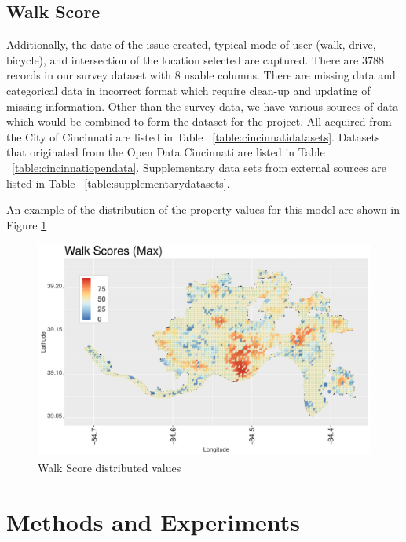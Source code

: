 \documentclass{llncs}
\begin{document}

\subsection{Walk Score\textsuperscript{\tiny\textregistered}}

Additionally, the date of the issue created, typical mode of user (walk, drive, bicycle), and intersection of the location selected are captured. There are 3788 records in our survey dataset with 8 usable columns. There are missing data and categorical data in incorrect format which require clean-up and updating of missing information. Other than the survey data, we have various sources of data which would be combined to form the dataset for the project. All acquired from the City of Cincinnati are listed in Table ~\ref{table:cincinnatidatasets}. Datasets that originated from the Open Data Cincinnati are listed in Table ~\ref{table:cincinnatiopendata}.  Supplementary data sets from external sources are listed in Table ~\ref{table:supplementarydatasets}.

An example of the distribution of the property values for this model are shown in Figure \ref{figure : walkScore}

\FloatBarrier
\begin{figure}
 	\includegraphics[width=\textwidth, height=\textheight, keepaspectratio]{walkScore}
 	\caption{Walk Score\textsuperscript{\tiny\textregistered} distributed values}
	\label{figure : walkScore}
\end{figure}
\FloatBarrier

\section{Methods and Experiments}
\end{document}
